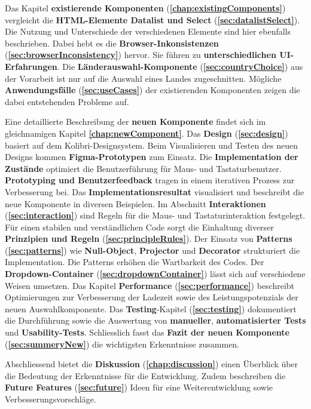 Das Kapitel \textbf{existierende Komponenten} (\textbf{\ref{chap:existingComponents}}) vergleicht die \textbf{HTML-Elemente Datalist und Select} (\textbf{\ref{sec:datalistSelect}}). 
Die Nutzung und Unterschiede der verschiedenen Elemente sind hier ebenfalls beschrieben. 
Dabei hebt es die \textbf{Browser-Inkonsistenzen} (\textbf{\ref{sec:browserInconsistency}}) hervor. 
Sie führen zu \textbf{unterschiedlichen UI-Erfahrungen}. 
Die \textbf{Länderauswahl-Komponente} (\textbf{\ref{sec:countryChoice}}) aus der Vorarbeit ist nur auf die Auswahl eines Landes zugeschnitten. 
Mögliche \textbf{Anwendungsfälle} (\textbf{\ref{sec:useCases}}) der existierenden Komponenten zeigen die dabei entstehenden Probleme auf. 

Eine detaillierte Beschreibung der \textbf{neuen Komponente} findet sich im gleichnamigen Kapitel \textbf{\ref{chap:newComponent}}. 
Das \textbf{Design} (\textbf{\ref{sec:design}}) basiert auf dem Kolibri-Designsystem. 
Beim Visualisieren und Testen des neuen Designs kommen \textbf{Figma-Prototypen} zum Einsatz. 
Die \textbf{Implementation der Zustände} optimiert die Benutzerführung für Maus- und Tastaturbenutzer. 
\textbf{Prototyping und Benutzerfeedback} tragen in einem iterativen Prozess zur Verbesserung bei.
Das \textbf{Implementationsresultat} visualisiert und beschreibt die neue Komponente in diversen Beispielen.
Im Abschnitt \textbf{Interaktionen} (\textbf{\ref{sec:interaction}}) sind Regeln für die Maus- und Tastaturinteraktion festgelegt. 
Für einen stabilen und verständlichen Code sorgt die Einhaltung diverser \textbf{Prinzipien und Regeln} (\textbf{\ref{sec:principleRules}}). 
Der Einsatz von \textbf{Patterns} (\textbf{\ref{sec:patterns}}) wie \textbf{Null-Object}, \textbf{Projector} und \textbf{Decorator} strukturiert die Implementation. 
Die Patterns erhöhen die Wartbarkeit des Codes. 
Der \textbf{Dropdown-Container} (\textbf{\ref{sec:dropdownContainer}}) lässt sich auf verschiedene Weisen umsetzen. 
Das Kapitel \textbf{Performance} (\textbf{\ref{sec:performance}}) beschreibt Optimierungen zur Verbesserung der Ladezeit sowie des Leistungspotenzials der neuen Auswahlkomponente. 
Das \textbf{Testing}-Kapitel (\textbf{\ref{sec:testing}}) dokumentiert die Durchführung sowie die Auswertung von \textbf{manueller}, \textbf{automatisierter Tests} und \textbf{Usability-Tests}. 
Schliesslich fasst das \textbf{Fazit der neuen Komponente} (\textbf{\ref{sec:summeryNew}}) die wichtigsten Erkenntnisse zusammen. 

Abschliessend bietet die \textbf{Diskussion} (\textbf{\ref{chap:discussion}}) einen Überblick über die Bedeutung der Erkenntnisse für die Entwicklung. 
Zudem beschreiben die \textbf{Future Features} (\textbf{\ref{sec:future}}) Ideen für eine Weiterentwicklung sowie Verbesserungsvorschläge. 
